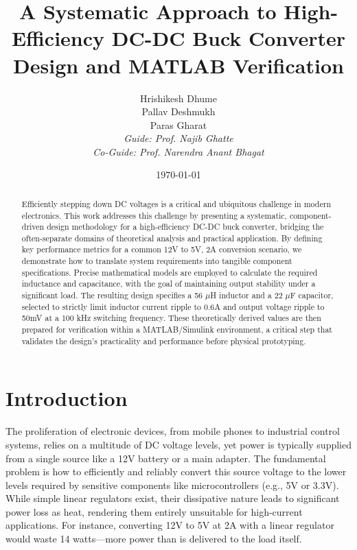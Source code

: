 \documentclass[12pt, a4paper]{article}
\title{A Systematic Approach to High-Efficiency DC-DC Buck Converter Design and MATLAB Verification}
\author{Hrishikesh Dhume \\ Pallav Deshmukh \\ Paras Gharat \\[1em] \textit{Guide: Prof. Najib Ghatte} \\ \textit{Co-Guide: Prof. Narendra Anant Bhagat}}
\date{\today}
\begin{document}
\maketitle

\thispagestyle{fancy} %



\begin{abstract}

\noindent Efficiently stepping down DC voltages is a critical and ubiquitous challenge in modern electronics. This work addresses this challenge by presenting a systematic, component-driven design methodology for a high-efficiency DC-DC buck converter, bridging the often-separate domains of theoretical analysis and practical application. By defining key performance metrics for a common 12V to 5V, 2A conversion scenario, we demonstrate how to translate system requirements into tangible component specifications. Precise mathematical models are employed to calculate the required inductance and capacitance, with the goal of maintaining output stability under a significant load. The resulting design specifies a 56 $\mu$H inductor and a 22 $\mu$F capacitor, selected to strictly limit inductor current ripple to 0.6A and output voltage ripple to 50mV at a 100 kHz switching frequency. These theoretically derived values are then prepared for verification within a MATLAB/Simulink environment, a critical step that validates the design's practicality and performance before physical prototyping.

\end{abstract}



\section{Introduction}

The proliferation of electronic devices, from mobile phones to industrial control systems, relies on a multitude of DC voltage levels, yet power is typically supplied from a single source like a 12V battery or a main adapter. The fundamental problem is how to efficiently and reliably convert this source voltage to the lower levels required by sensitive components like microcontrollers (e.g., 5V or 3.3V). While simple linear regulators exist, their dissipative nature leads to significant power loss as heat, rendering them entirely unsuitable for high-current applications. For instance, converting 12V to 5V at 2A with a linear regulator would waste 14 watts—more power than is delivered to the load itself.
\end{document}
